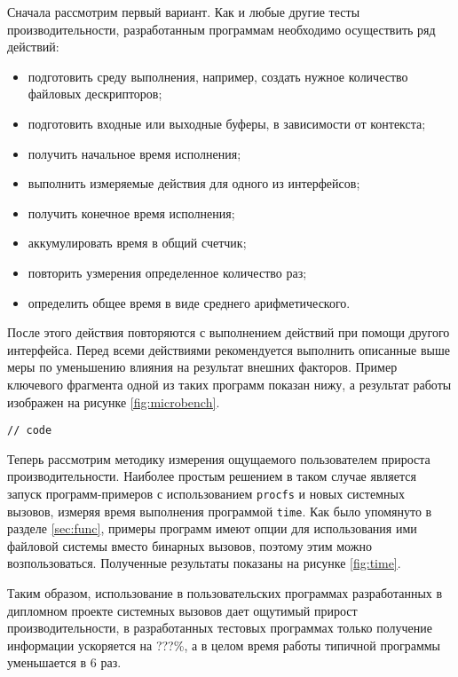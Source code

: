 Сначала рассмотрим первый вариант. Как и любые другие тесты производительности,
разработанным программам необходимо осуществить ряд действий:
\begin{itemize}
\item подготовить среду выполнения, например, создать нужное количество файловых
  дескрипторов;
\item подготовить входные или выходные буферы, в зависимости от контекста;
\item получить начальное время исполнения;
\item выполнить измеряемые действия для одного из интерфейсов;
\item получить конечное время исполнения;
\item аккумулировать время в общий счетчик;
\item повторить узмерения определенное количество раз;
\item определить общее время в виде среднего арифметического.
\end{itemize}

После этого действия повторяются с выполнением действий при помощи другого
интерфейса. Перед всеми действиями рекомендуется выполнить описанные выше
меры по уменьшению влияния на результат внешних факторов. Пример ключевого
фрагмента одной из таких программ показан нижу, а результат работы изображен на
рисунке \ref{fig:microbench}.
\medskip
\begin{lstlisting}[style=cstyle]
// code
\end{lstlisting}
\medskip

Теперь рассмотрим методику измерения ощущаемого пользователем прироста
производительности. Наиболее простым решением в таком случае является запуск
программ-примеров с использованием \texttt{procfs} и новых системных вызовов,
измеряя время выполнения программой \texttt{time}. Как было упомянуто в разделе
\ref{sec:func}, примеры программ имеют опции для использования ими файловой
системы вместо бинарных вызовов, поэтому этим можно возпользоваться. Полученные
результаты показаны на рисунке \ref{fig:time}.

Таким образом, использование в пользовательских программах разработанных в
дипломном проекте системных вызовов дает ощутимый прирост производительности, в
разработанных тестовых программах только получение информации ускоряется на
???\%, а в целом время работы типичной программы уменьшается в 6 раз.
